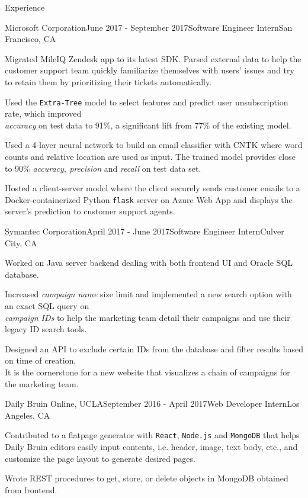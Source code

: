 \documentclass{resume} %
\begin{document}
\begin{rSection}{Experience}

\begin{rSubsection}{Microsoft Corporation}{June 2017 - September 2017}{Software Engineer Intern}{San Francisco, CA}
\item Migrated MileIQ Zendesk app to its latest SDK. Parsed external data to help the customer support team quickly familiarize themselves with users' issues and try to retain them by prioritizing their tickets automatically.
\item Used the \texttt{Extra-Tree} model to select features and predict user unsubscription rate, which improved\\
\textit{accuracy} on test data to 91\%, a significant lift from 77\% of the existing model.
\item Used a 4-layer neural network to build an email classifier with CNTK where word counts and relative location are used as input. The trained model provides close to 90\% \textit{accuracy, precision} and \textit{recall} on test data set.
\item Hosted a client-server model where the client securely sends customer emails to a Docker-containerized Python \texttt{flask} server on Azure Web App and displays the server's prediction to customer support agents.
\end{rSubsection}

\begin{rSubsection}{Symantec Corporation}{April 2017 - June 2017}{Software Engineer Intern}{Culver City, CA}
\item Worked on Java server backend dealing with both frontend UI and Oracle SQL database.
\item Increased \textit{campaign name} size limit and implemented a new search option with an exact SQL query on\\ 
\textit{campaign IDs} to help the marketing team detail their campaigns and use their legacy ID search tools.
\item Designed an API to exclude certain IDs from the database and filter results based on time of creation.\\
It is the cornerstone for a new website that visualizes a chain of campaigns for the marketing team.
\end{rSubsection}

\begin{rSubsection}{Daily Bruin Online, UCLA}{September 2016 - April 2017}{Web Developer Intern}{Los Angeles, CA}
\item Contributed to a flatpage generator with \texttt{React}, \texttt{Node.js} and \texttt{MongoDB} that helps Daily Bruin editors easily input contents, i.e. header, image, text body, etc., and customize the page layout to generate desired pages.
\item Wrote REST procedures to get, store, or delete objects in MongoDB obtained from frontend.
\end{rSubsection}



\end{rSection}
\end{document}

